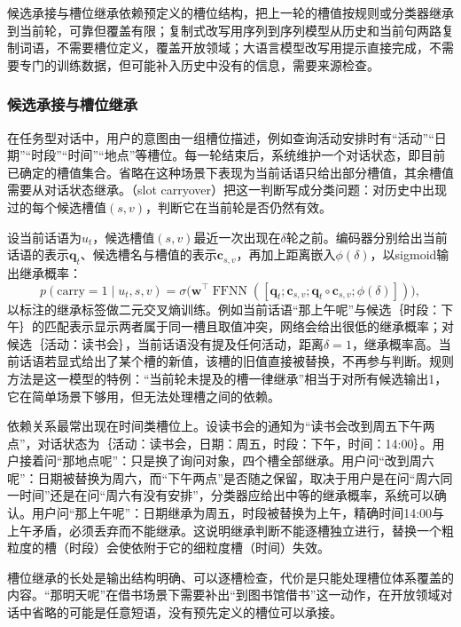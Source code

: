 候选承接与槽位继承依赖预定义的槽位结构，把上一轮的槽值按规则或分类器继承到当前轮，可靠但覆盖有限；复制式改写用序列到序列模型从历史和当前句两路复制词语，不需要槽位定义，覆盖开放领域；大语言模型改写用提示直接完成，不需要专门的训练数据，但可能补入历史中没有的信息，需要来源检查。

\subsubsection{候选承接与槽位继承}
\label{sec:nlp-analysis-slot-carryover}

在任务型对话中，用户的意图由一组槽位描述，例如查询活动安排时有“活动”“日期”“时段”“时间”“地点”等槽位。每一轮结束后，系统维护一个对话状态，即目前已确定的槽值集合。省略在这种场景下表现为当前话语只给出部分槽值，其余槽值需要从对话状态继承。（slot carryover）把这一判断写成分类问题：对历史中出现过的每个候选槽值$(s,v)$，判断它在当前轮是否仍然有效。

设当前话语为$u_t$，候选槽值$(s,v)$最近一次出现在$\delta$轮之前。编码器分别给出当前话语的表示$\bm q_t$、候选槽名与槽值的表示$\bm c_{s,v}$，再加上距离嵌入$\phi(\delta)$，以sigmoid输出继承概率：
\[
  p(\mathrm{carry}=1\mid u_t,s,v)=\sigma\bigl(\bm w^{\top}\operatorname{FFNN}([\bm q_t;\bm c_{s,v};\bm q_t\circ\bm c_{s,v};\phi(\delta)])\bigr),
\]
以标注的继承标签做二元交叉熵训练。例如当前话语“那上午呢”与候选｛时段：下午｝的匹配表示显示两者属于同一槽且取值冲突，网络会给出很低的继承概率；对候选｛活动：读书会｝，当前话语没有提及任何活动，距离$\delta=1$，继承概率高。当前话语若显式给出了某个槽的新值，该槽的旧值直接被替换，不再参与判断。规则方法是这一模型的特例：“当前轮未提及的槽一律继承”相当于对所有候选输出1，它在简单场景下够用，但无法处理槽之间的依赖。

依赖关系最常出现在时间类槽位上。设读书会的通知为“读书会改到周五下午两点”，对话状态为｛活动：读书会，日期：周五，时段：下午，时间：14:00｝。用户接着问“那地点呢”：只是换了询问对象，四个槽全部继承。用户问“改到周六呢”：日期被替换为周六，而“下午两点”是否随之保留，取决于用户是在问“周六同一时间”还是在问“周六有没有安排”，分类器应给出中等的继承概率，系统可以确认。用户问“那上午呢”：日期继承为周五，时段被替换为上午，精确时间14:00与上午矛盾，必须丢弃而不能继承。这说明继承判断不能逐槽独立进行，替换一个粗粒度的槽（时段）会使依附于它的细粒度槽（时间）失效。

槽位继承的长处是输出结构明确、可以逐槽检查，代价是只能处理槽位体系覆盖的内容。“那明天呢”在借书场景下需要补出“到图书馆借书”这一动作，在开放领域对话中省略的可能是任意短语，没有预先定义的槽位可以承接。

